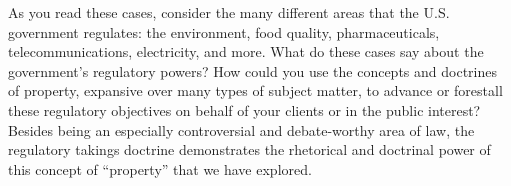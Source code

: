As you read these cases, consider the many different areas that the U.S.
government regulates: the environment, food quality, pharmaceuticals,
telecommunications, electricity, and more. What do these cases say about the
government's regulatory powers? How could you use the concepts and doctrines of
property, expansive over many types of subject matter, to advance or forestall
these regulatory objectives on behalf of your clients or in the public interest?
Besides being an especially controversial and debate-worthy area of law, the
regulatory takings doctrine demonstrates the rhetorical and doctrinal power of
this concept of ``property'' that we have explored.



